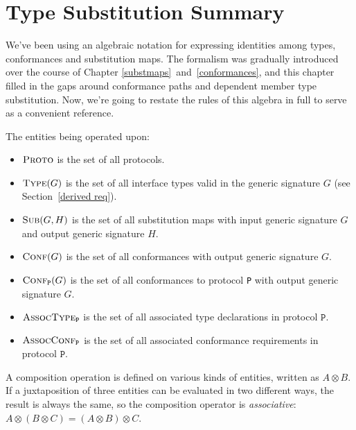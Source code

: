 \documentclass[../generics]{subfiles}
\begin{document}
\chapter{Type Substitution Summary}\label{notation summary}

We've been using an algebraic notation for expressing identities among types, conformances and substitution maps. The formalism was gradually introduced over the course of Chapter \ref{substmaps}~and~\ref{conformances}, and this chapter filled in the gaps around conformance paths and dependent member type substitution. Now, we're going to restate the rules of this algebra in full to serve as a convenient reference.

The entities being operated upon:
\begin{itemize}
\item {}$\textsc{Proto}$ is the set of all protocols.
\item {}$\textsc{Type}({G})$ is the set of all interface types valid in the generic signature $G$ (see Section~\ref{derived req}).
\item {}$\textsc{Sub}({G, H})$ is the set of all substitution maps with input generic signature $G$ and output generic signature $H$.
\item {}$\textsc{Conf}({G})$ is the set of all conformances with output generic signature $G$.
\item {}$\textsc{Conf}_{\texttt{P}}({G})$ is the set of all conformances to protocol \texttt{P} with output generic signature $G$.
\item {}$\textsc{AssocType}_{\texttt{P}}$ is the set of all associated type declarations in protocol $\texttt{P}$.
\item {}$\textsc{AssocConf}_{\texttt{P}}$ is the set of all associated conformance requirements in protocol $\texttt{P}$.
\end{itemize}
A composition operation is defined on various kinds of entities, written as \index{$\otimes$}$A \otimes B$. If a juxtaposition of three entities can be evaluated in two different ways, the result is always the same, so the composition operator is \emph{associative}: $A\otimes (B\otimes C) = (A\otimes B) \otimes C$.
\end{document}
